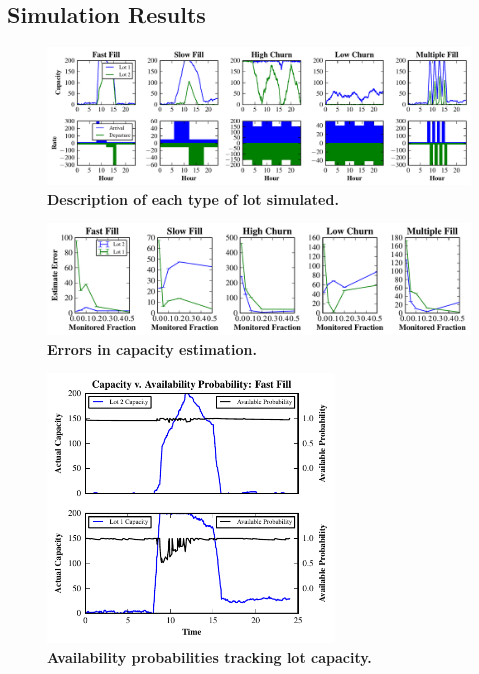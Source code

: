 \subsection{Simulation Results}
\label{subsec-simulator}

\begin{figure}
\centering
\includegraphics[width=\textwidth]{./simulator/figures/lots.pdf}

\caption{\textbf{Description of each type of lot simulated.} }

\label{fig-lotsdescription}
\end{figure}

\begin{figure}
\centering
\includegraphics[width=\textwidth]{./simulator/figures/capacity_experiment.pdf}

\caption{\textbf{Errors in capacity estimation.} }

\label{fig-capacityerrors}
\end{figure}

\begin{figure}
\centering
\includegraphics[width=3.0in]{./simulator/figures/tracking_fastfill.pdf}

\caption{\textbf{Availability probabilities tracking lot capacity.} }

\label{fig-trackingexample}
\end{figure}


